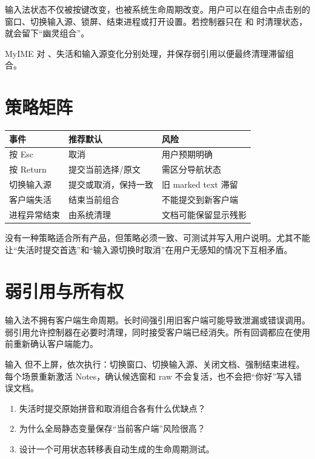 输入法状态不仅被按键改变，也被系统生命周期改变。用户可以在组合中点击别的窗口、切换输入源、锁屏、结束进程或打开设置。若控制器只在  和  时清理状态，就会留下“幽灵组合”。

MyIME 对 、失活和输入源变化分别处理，并保存弱引用以便最终清理滞留组合。



\section{策略矩阵}

\begin{center}
\begin{tabular}{p{3cm}p{3cm}p{5cm}}
\toprule
事件 & 推荐默认 & 风险 \\
\midrule
按 Esc & 取消 & 用户预期明确 \\
按 Return & 提交当前选择/原文 & 需区分导航状态 \\
切换输入源 & 提交或取消，保持一致 & 旧 marked text 滞留 \\
客户端失活 & 结束当前组合 & 不能提交到新客户端 \\
进程异常结束 & 由系统清理 & 文档可能保留显示残影 \\
\bottomrule
\end{tabular}
\end{center}

没有一种策略适合所有产品，但策略必须一致、可测试并写入用户说明。尤其不能让“失活时提交首选”和“输入源切换时取消”在用户无感知的情况下互相矛盾。

\section{弱引用与所有权}

输入法不拥有客户端生命周期。长时间强引用旧客户端可能导致泄漏或错误调用。弱引用允许控制器在必要时清理，同时接受客户端已经消失。所有回调都应在使用前重新确认客户端能力。

\begin{lab}[幽灵状态测试]
输入  但不上屏，依次执行：切换窗口、切换输入源、关闭文档、强制结束进程。每个场景重新激活 Notes，确认候选窗和 raw 不会复活，也不会把“你好”写入错误文档。
\end{lab}

\exercises
\begin{enumerate}
  \item 失活时提交原始拼音和取消组合各有什么优缺点？
  \item 为什么全局静态变量保存“当前客户端”风险很高？
  \item 设计一个可用状态转移表自动生成的生命周期测试。
\end{enumerate}

